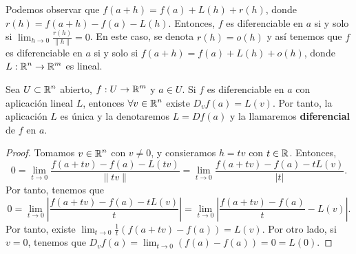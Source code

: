 \begin{observation}
Podemos observar que $\displaystyle f\left(a+h\right) = f\left(a\right) + L\left(h\right) + r\left(h\right) $, donde $\displaystyle r\left(h\right) = f\left(a+h\right)-f\left(a\right)-L\left(h\right) $. Entonces, $\displaystyle f $ es diferenciable en $\displaystyle a $ si y solo si $\displaystyle \lim_{h \to 0}\frac{r\left(h\right)}{ \|h\|} = 0 $. En este caso, se denota $\displaystyle r\left(h\right) = o\left(h\right) $ y así tenemos que $\displaystyle f $ es diferenciable en $\displaystyle a $ si y solo si $\displaystyle f\left(a+h\right) = f\left(a\right)+L\left(h\right)+o\left(h\right) $, donde $\displaystyle L : \mathbb{R}^{n} \to \mathbb{R}^{m} $ es lineal.
\end{observation}
\begin{prop}
Sea $\displaystyle U \subset \mathbb{R}^{n} $ abierto, $\displaystyle f : U \to \mathbb{R}^{m} $ y $\displaystyle a \in U $. Si $\displaystyle f $ es diferenciable en $\displaystyle a $ con aplicación lineal $\displaystyle L $, entonces $\displaystyle \forall v \in \mathbb{R}^{n} $ existe $\displaystyle D_{v}f\left(a\right) = L\left(v\right) $. Por tanto, la aplicación $\displaystyle L $ es única y la denotaremos $\displaystyle L = Df\left(a\right) $ y la llamaremos \textbf{diferencial} de $\displaystyle f $ en $\displaystyle a $.
\end{prop}
\begin{proof}
Tomamos $\displaystyle v \in \mathbb{R}^{n} $ con $\displaystyle v \neq 0 $, y consieramos $\displaystyle h = tv $ con $\displaystyle t \in \mathbb{R} $. Entonces, 
\[0 = \lim_{t \to 0}\frac{f\left(a+tv\right)-f\left(a\right)-L\left(tv\right)}{ \|tv\|} = \lim_{t \to 0}\frac{f\left(a+tv\right)-f\left(a\right)-tL\left(v\right)}{ \left|t\right|} .\]
Por tanto, tenemos que 
\[0 = \lim_{t \to 0} \left|\frac{f\left(a+tv\right)-f\left(a\right)-tL\left(v\right)}{t}\right| = \lim_{t \to 0} \left|\frac{f\left(a+tv\right)-f\left(a\right)}{t}-L\left(v\right)\right| .\]
Por tanto, existe $\displaystyle \lim_{t \to 0}\frac{1}{t}\left(f\left(a+tv\right)-f\left(a\right)\right) = L\left(v\right) $. Por otro lado, si $\displaystyle v = 0 $, tenemos que $\displaystyle D_{v}f\left(a\right) = \lim_{t \to 0}\left(f\left(a\right)-f\left(a\right)\right) = 0 = L\left(0\right) $.
\end{proof}
